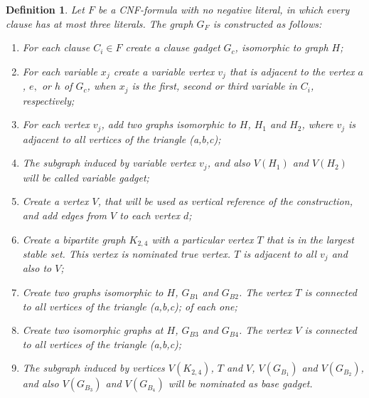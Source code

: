 \documentclass[9pt]{entcs}
\newtheorem{defi}{Definition}[section]
\begin{document}
\begin{defi}\label{sec:reducao}
Let $F$ be a CNF-formula with no negative literal, in which every clause has at most three literals. The graph $G_F$ is constructed as follows:

\begin{enumerate}
\item For each clause $C_i \in F$ create a  \textit{clause gadget} $G_{c}$, isomorphic to  graph $H$;

\item For each variable $x_{j}$ create a variable vertex $v_{j}$ that is adjacent to the vertex $a$, $e,$ or $h$ of $G_c$, when $x_{j}$ is the first, second or third variable in $C_i$, respectively;

\item For each vertex $v_{j}$, add two graphs  isomorphic to $H$, $H_1$ and $H_2$, where $v_{j}$ is  adjacent to all vertices of the triangle (a,b,c);%

\item The  subgraph induced by \emph{variable vertex}  $v_{j}$, and also $V(H_1)$ and $V(H_2)$ will be called \emph{variable gadget}; 

\item Create a vertex $V$, that will be used as vertical reference of the construction, and add edges from $V$ to each vertex  $d$;%

\item Create a bipartite graph $K_{2,4}$ with a particular vertex $T$ that is in the largest stable set. This vertex is nominated \emph{true vertex}. $T$ is adjacent to all $v_{j}$ and also to $V$;

\item Create two  graphs isomorphic to $H$, $G_{B1}$ and $G_{B2}$. The vertex $T$ is connected to all vertices of the triangle (a,b,c); %
of each one;


\item Create two isomorphic graphs at $H$, $G_{B3}$ and $G_{B4}$. The vertex $V$ is connected to all vertices of the triangle (a,b,c);%

\item The  subgraph induced by vertices $V(K_{2,4})$, $T$ and $V$,  $V(G_{B_1})$ and $V(G_{B_2})$, and also $V(G_{B_3})$ and $V(G_{B_4})$ will be nominated as \emph{base gadget}. 
\end{enumerate}
\end{defi}
\end{document}
